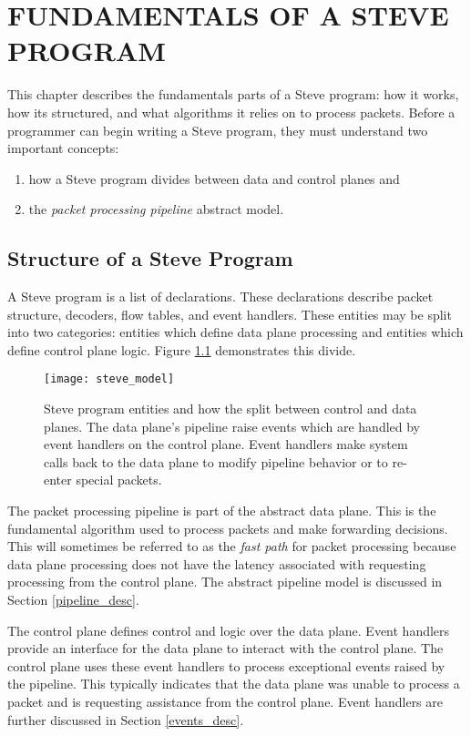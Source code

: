 \chapter{FUNDAMENTALS OF A STEVE PROGRAM} \label{ch:pipeline_model}

This chapter describes the fundamentals parts of a Steve program: how it works,
how its structured, and what algorithms it relies on to process packets.
Before a programmer can begin writing a Steve program, they must understand
two important concepts: 

\begin{enumerate}
\item how a Steve program divides between data and control planes and
\item the \emph{packet processing pipeline} abstract model.
\end{enumerate}

\section{Structure of a Steve Program}

A Steve program is a list of declarations. These declarations describe
packet structure, decoders, flow tables, and event handlers.
These entities may be split into two categories:
entities which define data plane processing and
entities which define control plane logic. 
Figure \ref{fg:abstract_switch} demonstrates this divide.

\begin{figure}[ht]
\texttt{[image: steve\_model]}
\caption{Steve program entities and how the split between control and
data planes. The data plane's pipeline raise events which are handled by event 
handlers on the control plane. Event handlers make system calls back to the
data plane to modify pipeline behavior or to re-enter special packets.}
\label{fg:abstract_switch} 
\end{figure}

The packet processing pipeline is part of the abstract data plane.
This is the fundamental algorithm used to process packets and
make forwarding decisions.
This will sometimes be referred to as the \emph{fast path} for packet
processing because
data plane processing does not have the latency associated
with requesting processing from the control plane. 
The abstract pipeline model is discussed in Section \ref{pipeline_desc}.

The control plane defines control
and logic over the data plane. 
Event handlers provide an interface for the data plane to interact with
the control plane.
The control plane uses these event handlers
to process exceptional events raised by the pipeline.
This typically indicates that the data plane was unable to process a packet
and is requesting assistance from the control plane.
Event handlers are further discussed in Section \ref{events_desc}.

